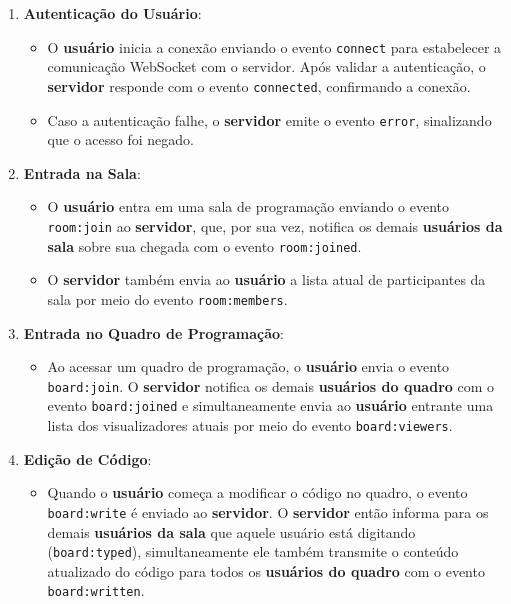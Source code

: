\begin{enumerate}
    \item \textbf{Autenticação do Usuário}:
    \begin{itemize}
        \item O \textbf{usuário} inicia a conexão enviando o evento \texttt{connect} para estabelecer a comunicação WebSocket com o servidor. Após validar a autenticação, o \textbf{servidor} responde com o evento \texttt{connected}, confirmando a conexão.
        \item Caso a autenticação falhe, o \textbf{servidor} emite o evento \texttt{error}, sinalizando que o acesso foi negado.
    \end{itemize}

    \item \textbf{Entrada na Sala}:
    \begin{itemize}
        \item O \textbf{usuário} entra em uma sala de programação enviando o evento \texttt{room:join} ao \textbf{servidor}, que, por sua vez, notifica os demais \textbf{usuários da sala} sobre sua chegada com o evento \texttt{room:joined}.
        \item O \textbf{servidor} também envia ao \textbf{usuário} a lista atual de participantes da sala por meio do evento \texttt{room:members}.
    \end{itemize}

    \item \textbf{Entrada no Quadro de Programação}:
    \begin{itemize}
        \item Ao acessar um quadro de programação, o \textbf{usuário} envia o evento \texttt{board:join}. O \textbf{servidor} notifica os demais \textbf{usuários do quadro} com o evento \texttt{board:joined} e simultaneamente envia ao \textbf{usuário} entrante uma lista dos visualizadores atuais por meio do evento \texttt{board:viewers}.
    \end{itemize}

    \item \textbf{Edição de Código}:
    \begin{itemize}
        \item Quando o \textbf{usuário} começa a modificar o código no quadro, o evento \texttt{board:write} é enviado ao \textbf{servidor}. O \textbf{servidor} então informa para os demais \textbf{usuários da sala} que aquele usuário está digitando (\texttt{board:typed}), simultaneamente ele também transmite o conteúdo atualizado do código para todos os \textbf{usuários do quadro} com o evento \texttt{board:written}.
    \end{itemize}


\end{enumerate}

